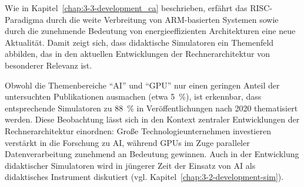 Wie in Kapitel~\ref{chap:3-3-development_ca} beschrieben, erfährt das \ac{RISC}-Paradigma durch die weite Verbreitung von ARM-basierten Systemen sowie durch die zunehmende Bedeutung von energieeffizienten Architekturen eine neue Aktualität. Damit zeigt sich, dass didaktische Simulatoren ein Themenfeld abbilden, das in den aktuellen Entwicklungen der Rechnerarchitektur von besonderer Relevanz ist.

Obwohl die Themenbereiche \enquote{AI} und \enquote{GPU} nur einen geringen Anteil der untersuchten Publikationen ausmachen (etwa 5~\%), ist erkennbar, dass entsprechende Simulatoren zu 88~\% in Veröffentlichungen nach 2020 thematisiert werden. Diese Beobachtung lässt sich in den Kontext zentraler Entwicklungen der Rechnerarchitektur einordnen: Große Technologieunternehmen investieren verstärkt in die Forschung zu \acs{AI}, während GPUs im Zuge paralleler Datenverarbeitung zunehmend an Bedeutung gewinnen. Auch in der Entwicklung didaktischer Simulatoren wird in jüngerer Zeit der Einsatz von \ac{AI} als didaktisches Instrument diskutiert (vgl. Kapitel~\ref{chap:3-2-development-sim}).

